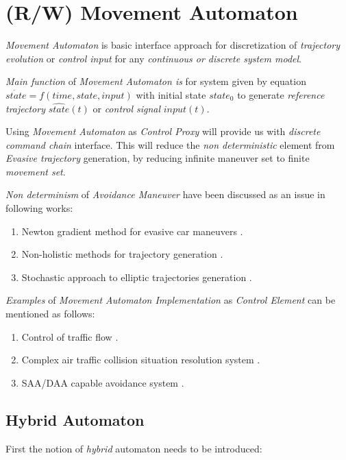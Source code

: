 \section{(R/W) Movement Automaton}

    \noindent\emph{Movement Automaton} is basic interface approach for discretization of \emph{trajectory evolution}  or \emph{control input} for any \emph{continuous or discrete system model}.
    
    \emph{Main function} of \emph{Movement Automaton is} for system given by equation $\dot{state}=f(time,state,input)$ with initial state $state_0$ to generate \emph{reference trajectory} $\hat{state}(t)$ or \emph{control signal} $input(t)$.
    
    Using \emph{Movement Automaton} as \emph{Control Proxy} will provide us with \emph{discrete command chain} interface. This will reduce the \emph{non deterministic} element from \emph{Evasive trajectory} generation, by reducing infinite maneuver set to finite \emph{movement set}.
    
    \emph{Non determinism} of \emph{Avoidance Maneuver} have been discussed as an issue in following works:
    \begin{enumerate}
        \item Newton gradient method for evasive car maneuvers \cite{vsantin2011combined}.
        \item Non-holistic methods for trajectory generation \cite{pin1990autonomous}.
        \item Stochastic approach to elliptic trajectories generation \cite{andrzejak2001epileptic}.
    \end{enumerate}
    
    \emph{Examples} of \emph{Movement Automaton Implementation} as \emph{Control Element} can be mentioned as follows:
    \begin{enumerate}
        \item Control of traffic flow \cite{kuwata2009real}.
        \item Complex air traffic collision situation resolution system  \cite{frazzoli2001robust,frazzoli2000trajectory}.
        \item SAA/DAA capable avoidance system \cite{gomola2017obstacle}.
    \end{enumerate}


    \subsection{Hybrid Automaton}\label{s:HybridAutomaton}
    \noindent First the notion of  \emph{hybrid} automaton  \cite{lazar2006model,borrelli2006mpc,daws1996tool} needs to be introduced:

